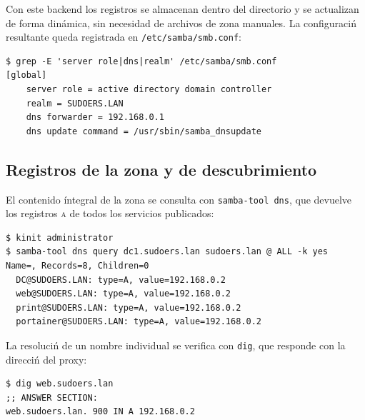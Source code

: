 Con este backend los registros se almacenan dentro del directorio y se
actualizan de forma din\'amica, sin necesidad de archivos de zona
manuales. La configuraci\'n resultante queda registrada en
\texttt{/etc/samba/smb.conf}:

\begin{lstlisting}[style=terminal]
$ grep -E 'server role|dns|realm' /etc/samba/smb.conf
[global]
    server role = active directory domain controller
    realm = SUDOERS.LAN
    dns forwarder = 192.168.0.1
    dns update command = /usr/sbin/samba_dnsupdate
\end{lstlisting}


\subsection{Registros de la zona y de descubrimiento}

El contenido \'integral de la zona se consulta con \texttt{samba-tool dns},
que devuelve los registros \textsc{a} de todos los servicios publicados:

\begin{lstlisting}[style=terminal]
$ kinit administrator
$ samba-tool dns query dc1.sudoers.lan sudoers.lan @ ALL -k yes
Name=, Records=8, Children=0
  DC@SUDOERS.LAN: type=A, value=192.168.0.2
  web@SUDOERS.LAN: type=A, value=192.168.0.2
  print@SUDOERS.LAN: type=A, value=192.168.0.2
  portainer@SUDOERS.LAN: type=A, value=192.168.0.2
\end{lstlisting}


La resoluci\'n de un nombre individual se verifica con \texttt{dig}, que
responde con la direcci\'n del proxy:

\begin{lstlisting}[style=terminal]
$ dig web.sudoers.lan
;; ANSWER SECTION:
web.sudoers.lan. 900 IN A 192.168.0.2
\end{lstlisting}

